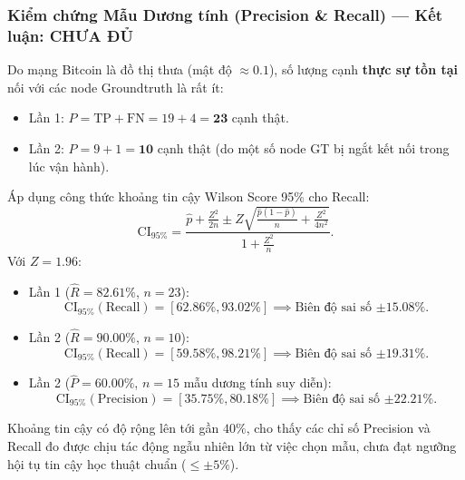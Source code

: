 \documentclass[11pt,a4paper]{article}
\begin{document}
\subsubsection{Kiểm chứng Mẫu Dương tính (Precision \& Recall) --- Kết luận: CHƯA ĐỦ}
Do mạng Bitcoin là đồ thị thưa (mật độ $\approx 0.1$), số lượng cạnh \textbf{thực sự tồn tại} nối với các node Groundtruth là rất ít:
\begin{itemize}
    \item Lần 1: $P = \text{TP} + \text{FN} = 19 + 4 = \mathbf{23}$ cạnh thật.
    \item Lần 2: $P = 9 + 1 = \mathbf{10}$ cạnh thật (do một số node GT bị ngắt kết nối trong lúc vận hành).
\end{itemize}
Áp dụng công thức khoảng tin cậy Wilson Score 95\% cho Recall:
\begin{equation}
    \text{CI}_{95\%} = \frac{\hat{p} + \frac{Z^2}{2n} \pm Z \sqrt{\frac{\hat{p}(1-\hat{p})}{n} + \frac{Z^2}{4n^2}}}{1 + \frac{Z^2}{n}}.
\end{equation}
Với $Z = 1.96$:
\begin{itemize}
    \item Lần 1 ($\hat{R} = 82.61\%$, $n = 23$):
    \begin{equation}
        \text{CI}_{95\%}(\text{Recall}) = [62.86\%, 93.02\%] \implies \text{Biên độ sai số } \mathbf{\pm 15.08\%}.
    \end{equation}
    \item Lần 2 ($\hat{R} = 90.00\%$, $n = 10$):
    \begin{equation}
        \text{CI}_{95\%}(\text{Recall}) = [59.58\%, 98.21\%] \implies \text{Biên độ sai số } \mathbf{\pm 19.31\%}.
    \end{equation}
    \item Lần 2 ($\hat{P} = 60.00\%$, $n = 15$ mẫu dương tính suy diễn):
    \begin{equation}
        \text{CI}_{95\%}(\text{Precision}) = [35.75\%, 80.18\%] \implies \text{Biên độ sai số } \mathbf{\pm 22.21\%}.
    \end{equation}
\end{itemize}
Khoảng tin cậy có độ rộng lên tới gần $40\%$, cho thấy các chỉ số Precision và Recall đo được chịu tác động ngẫu nhiên lớn từ việc chọn mẫu, chưa đạt ngưỡng hội tụ tin cậy học thuật chuẩn ($\le \pm 5\%$).
\end{document}
